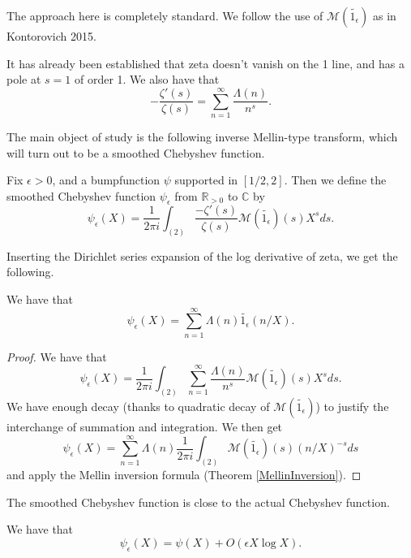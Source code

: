
The approach here is completely standard. We follow the use of $\mathcal{M}(\widetilde{1_{\epsilon}})$ as in Kontorovich 2015.




It has already been established that zeta doesn't vanish on the 1 line, and has a pole at $s=1$ of order 1.
We also have that
$$
-\frac{\zeta'(s)}{\zeta(s)} = \sum_{n=1}^\infty \frac{\Lambda(n)}{n^s}.
$$

The main object of study is the following inverse Mellin-type transform, which will turn out to be a smoothed Chebyshev function.
\begin{definition}\label{SmoothedChebyshev}
Fix $\epsilon>0$, and a bumpfunction $\psi$ supported in $[1/2,2]$. Then we define the smoothed Chebyshev function $\psi_{\epsilon}$ from $\mathbb{R}_{>0}$ to $\mathbb{C}$ by
$$\psi_{\epsilon}(X) = \frac{1}{2\pi i}\int_{(2)}\frac{-\zeta'(s)}{\zeta(s)}
\mathcal{M}(\widetilde{1_{\epsilon}})(s)
X^{s}ds.$$
\end{definition}



Inserting the Dirichlet series expansion of the log derivative of zeta, we get the following.
\begin{theorem}\label{SmoothedChebyshevDirichlet}
We have that
$$\psi_{\epsilon}(X) = \sum_{n=1}^\infty \Lambda(n)\widetilde{1_{\epsilon}}(n/X).$$
\end{theorem}



\begin{proof}
We have that
$$\psi_{\epsilon}(X) = \frac{1}{2\pi i}\int_{(2)}\sum_{n=1}^\infty \frac{\Lambda(n)}{n^s}
\mathcal{M}(\widetilde{1_{\epsilon}})(s)
X^{s}ds.$$
We have enough decay (thanks to quadratic decay of $\mathcal{M}(\widetilde{1_{\epsilon}})$) to justify the interchange of summation and integration. We then get
$$\psi_{\epsilon}(X) =
\sum_{n=1}^\infty \Lambda(n)\frac{1}{2\pi i}\int_{(2)}
\mathcal{M}(\widetilde{1_{\epsilon}})(s)
(n/X)^{-s}
ds
$$
and apply the Mellin inversion formula (Theorem \ref{MellinInversion}).
\end{proof}



The smoothed Chebyshev function is close to the actual Chebyshev function.
\begin{theorem}\label{SmoothedChebyshevClose}
We have that
$$\psi_{\epsilon}(X) = \psi(X) + O(\epsilon X \log X).$$
\end{theorem}



